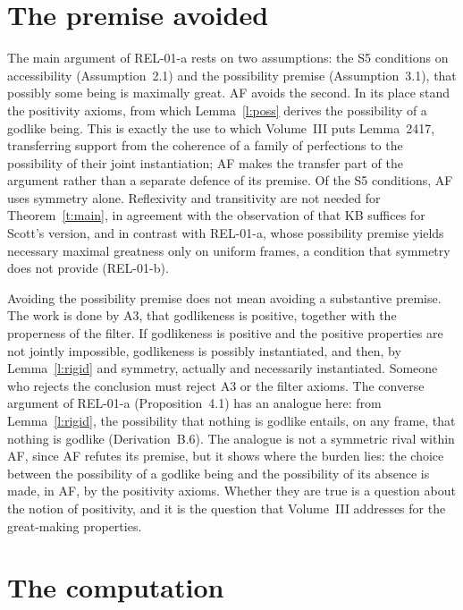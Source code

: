 \documentclass{situationist-preprint}
\begin{document}
\section{The premise avoided}\label{s:avoided}

The main argument of REL-01-a rests on two assumptions: the S5 conditions on accessibility (Assumption~2.1) and the possibility premise (Assumption~3.1), that possibly some being is maximally great. AF avoids the second. In its place stand the positivity axioms, from which Lemma~\ref{l:poss} derives the possibility of a godlike being. This is exactly the use to which Volume~III puts Lemma~2417, transferring support from the coherence of a family of perfections to the possibility of their joint instantiation; AF makes the transfer part of the argument rather than a separate defence of its premise. Of the S5 conditions, AF uses symmetry alone. Reflexivity and transitivity are not needed for Theorem~\ref{t:main}, in agreement with the observation of \citet{Benzmuller2014} that KB suffices for Scott's version, and in contrast with REL-01-a, whose possibility premise yields necessary maximal greatness only on uniform frames, a condition that symmetry does not provide (REL-01-b).

Avoiding the possibility premise does not mean avoiding a substantive premise. The work is done by A3, that godlikeness is positive, together with the properness of the filter. If godlikeness is positive and the positive properties are not jointly impossible, godlikeness is possibly instantiated, and then, by Lemma~\ref{l:rigid} and symmetry, actually and necessarily instantiated. Someone who rejects the conclusion must reject A3 or the filter axioms. The converse argument of REL-01-a (Proposition~4.1) has an analogue here: from Lemma~\ref{l:rigid}, the possibility that nothing is godlike entails, on any frame, that nothing is godlike (Derivation~B.6). The analogue is not a symmetric rival within AF, since AF refutes its premise, but it shows where the burden lies: the choice between the possibility of a godlike being and the possibility of its absence is made, in AF, by the positivity axioms. Whether they are true is a question about the notion of positivity, and it is the question that Volume~III addresses for the great-making properties.

\section{The computation}\label{s:computation}
\end{document}
